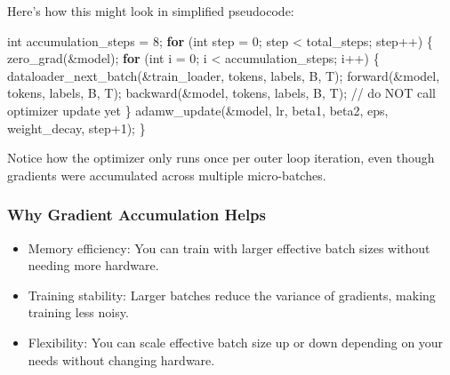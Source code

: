 \documentclass[
  letterpaper,
  DIV=11,
  numbers=noendperiod]{scrreprt}
\newenvironment{Shaded}{\begin{snugshade}}{\end{snugshade}}
\newcommand{\CommentTok}[1]{\textcolor[rgb]{0.37,0.37,0.37}{#1}}
\newcommand{\ControlFlowTok}[1]{\textcolor[rgb]{0.00,0.23,0.31}{\textbf{#1}}}
\newcommand{\DataTypeTok}[1]{\textcolor[rgb]{0.68,0.00,0.00}{#1}}
\newcommand{\DecValTok}[1]{\textcolor[rgb]{0.68,0.00,0.00}{#1}}
\newcommand{\NormalTok}[1]{\textcolor[rgb]{0.00,0.23,0.31}{#1}}
\newcommand{\OperatorTok}[1]{\textcolor[rgb]{0.37,0.37,0.37}{#1}}
\providecommand{\tightlist}{%
  \setlength{\itemsep}{0pt}\setlength{\parskip}{0pt}}
\begin{document}
Here's how this might look in simplified pseudocode:

\begin{Shaded}
\begin{Highlighting}[]
\DataTypeTok{int}\NormalTok{ accumulation\_steps }\OperatorTok{=} \DecValTok{8}\OperatorTok{;}
\ControlFlowTok{for} \OperatorTok{(}\DataTypeTok{int}\NormalTok{ step }\OperatorTok{=} \DecValTok{0}\OperatorTok{;}\NormalTok{ step }\OperatorTok{\textless{}}\NormalTok{ total\_steps}\OperatorTok{;}\NormalTok{ step}\OperatorTok{++)} \OperatorTok{\{}
\NormalTok{    zero\_grad}\OperatorTok{(\&}\NormalTok{model}\OperatorTok{);}
    \ControlFlowTok{for} \OperatorTok{(}\DataTypeTok{int}\NormalTok{ i }\OperatorTok{=} \DecValTok{0}\OperatorTok{;}\NormalTok{ i }\OperatorTok{\textless{}}\NormalTok{ accumulation\_steps}\OperatorTok{;}\NormalTok{ i}\OperatorTok{++)} \OperatorTok{\{}
\NormalTok{        dataloader\_next\_batch}\OperatorTok{(\&}\NormalTok{train\_loader}\OperatorTok{,}\NormalTok{ tokens}\OperatorTok{,}\NormalTok{ labels}\OperatorTok{,}\NormalTok{ B}\OperatorTok{,}\NormalTok{ T}\OperatorTok{);}
\NormalTok{        forward}\OperatorTok{(\&}\NormalTok{model}\OperatorTok{,}\NormalTok{ tokens}\OperatorTok{,}\NormalTok{ labels}\OperatorTok{,}\NormalTok{ B}\OperatorTok{,}\NormalTok{ T}\OperatorTok{);}
\NormalTok{        backward}\OperatorTok{(\&}\NormalTok{model}\OperatorTok{,}\NormalTok{ tokens}\OperatorTok{,}\NormalTok{ labels}\OperatorTok{,}\NormalTok{ B}\OperatorTok{,}\NormalTok{ T}\OperatorTok{);}
        \CommentTok{// do NOT call optimizer update yet}
    \OperatorTok{\}}
\NormalTok{    adamw\_update}\OperatorTok{(\&}\NormalTok{model}\OperatorTok{,}\NormalTok{ lr}\OperatorTok{,}\NormalTok{ beta1}\OperatorTok{,}\NormalTok{ beta2}\OperatorTok{,}\NormalTok{ eps}\OperatorTok{,}\NormalTok{ weight\_decay}\OperatorTok{,}\NormalTok{ step}\OperatorTok{+}\DecValTok{1}\OperatorTok{);}
\OperatorTok{\}}
\end{Highlighting}
\end{Shaded}

Notice how the optimizer only runs once per outer loop iteration, even
though gradients were accumulated across multiple micro-batches.

\subsubsection{Why Gradient Accumulation
Helps}\label{why-gradient-accumulation-helps}

\begin{itemize}
\tightlist
\item
  Memory efficiency: You can train with larger effective batch sizes
  without needing more hardware.
\item
  Training stability: Larger batches reduce the variance of gradients,
  making training less noisy.
\item
  Flexibility: You can scale effective batch size up or down depending
  on your needs without changing hardware.
\end{itemize}
\end{document}
